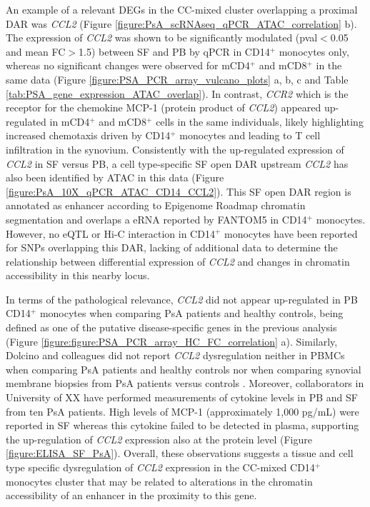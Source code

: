 An example of a relevant DEGs in the CC-mixed cluster overlapping a proximal DAR was \textit{CCL2} (Figure \ref{figure:PsA_scRNAseq_qPCR_ATAC_correlation} b). The expression of \textit{CCL2} was shown to be significantly modulated (pval$<$0.05 and mean FC$>$1.5) between SF and PB by qPCR in CD14$^+$ monocytes only, whereas no significant changes were observed for mCD4$^+$ and mCD8$^+$ in the same data (Figure \ref{figure:PSA_PCR_array_vulcano_plots} a, b, c and Table \ref{tab:PSA_gene_expression_ATAC_overlap}). In contrast, \textit{CCR2} which is the receptor for the chemokine MCP-1 (protein product of \textit{CCL2}) appeared up-regulated in mCD4$^+$ and mCD8$^+$ cells in the same individuals, likely highlighting increased chemotaxis driven by CD14$^+$ monocytes and leading to T cell infiltration in the synovium. Consistently with the up-regulated expression of \textit{CCL2} in SF versus PB, a cell type-specific SF open DAR upstream \textit{CCL2} has also been identified by ATAC in this data (Figure \ref{figure:PsA_10X_qPCR_ATAC_CD14_CCL2}). This SF open DAR region is annotated as enhancer according to Epigenome Roadmap chromatin segmentation and overlaps a eRNA reported by FANTOM5 in CD14$^+$ monocytes. However, no eQTL or Hi-C interaction in CD14$^+$ monocytes have been reported for SNPs overlapping this DAR, lacking of additional data to determine the relationship between differential expression of \textit{CCL2} and changes in chromatin accessibility in this nearby locus. 

In terms of the pathological relevance, \textit{CCL2} did not appear up-regulated in PB CD14$^+$ monocytes when comparing PsA patients and healthy controls, being defined as one of the putative disease-specific genes in the previous analysis (Figure \ref{figure:figure:PSA_PCR_array_HC_FC_correlation} a). Similarly, Dolcino and colleagues did not report \textit{CCL2} dysregulation neither in PBMCs when comparing PsA patients and healthy controls nor when comparing synovial membrane biopsies from PsA patients versus controls \parencite{Dolcino2015}. Moreover, collaborators in University of XX have performed measurements of cytokine levels in PB and SF from ten PsA patients. High levels of MCP-1 (approximately 1,000 pg/mL) were reported in SF whereas this cytokine failed to be detected in plasma, supporting the up-regulation of \textit{CCL2} expression also at the protein level (Figure \ref{figure:ELISA_SF_PsA}). Overall, these observations suggests a tissue and cell type specific dysregulation of \textit{CCL2} expression in the CC-mixed CD14$^+$ monocytes cluster that may be related to alterations in the chromatin accessibility of an enhancer in the proximity to this gene.


